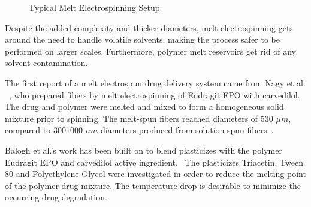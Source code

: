 \bgroup
\begin{figure}[!htbp]
\centering \makeatletter{}
\makeatother 
\caption{{Typical Melt Electrospinning Setup}}
\label{f-bfd139aecf8f}
\end{figure}
\egroup
Despite the added complexity and thicker diameters, melt electrospinning  gets around the need to handle volatile solvents, making the process safer to be performed on larger scales. Furthermore, polymer melt reservoirs get rid of any solvent contamination.

The first report of a melt electrospun drug delivery system came from Nagy et al. \unskip~\cite{527120:13445555}, who prepared fibers by melt electrospinning of Eudragit EPO with carvedilol. The drug and polymer were melted and mixed to form a homogeneous solid mixture prior to spinning. The melt-spun fibers reached diameters of 5{\textendash}30 $\mu m $, compared to 300{\textendash}1000 $nm $ diameters produced from solution-spun fibers\unskip~\cite{527120:13445555}.

Balogh et al.'s work has been built on to blend plasticizes with the polymer Eudragit EPO and carvedilol active ingredient.\unskip~\cite{527120:13445752} The plasticizes Triacetin, Tween 80 and Polyethylene Glycol were investigated in order to reduce the melting point of the polymer-drug mixture. The temperature drop is desirable to minimize the occurring drug degradation.

